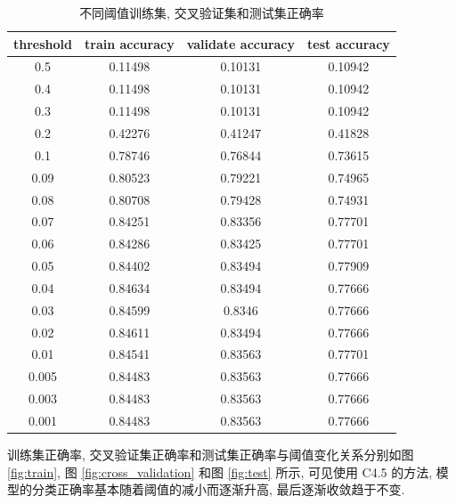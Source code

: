\documentclass[openany]{ctexbook}
\theoremstyle{kaiti}
\theoremstyle{normal}
\begin{document}
\begin{table}[htbp]
  \centering
  \caption{不同阈值训练集, 交叉验证集和测试集正确率}
  \label{tab:train_validate_acc}
  \begin{tabular}{cccc}
    \toprule
    threshold & train accuracy & validate accuracy & test accuracy \\
    \midrule
    0.5       & 0.11498        & 0.10131           & 0.10942      \\
    0.4       & 0.11498        & 0.10131           & 0.10942      \\
    0.3       & 0.11498        & 0.10131           & 0.10942      \\
    0.2       & 0.42276        & 0.41247           & 0.41828      \\
    0.1       & 0.78746        & 0.76844           & 0.73615      \\
    0.09      & 0.80523        & 0.79221           & 0.74965      \\
    0.08      & 0.80708        & 0.79428           & 0.74931      \\
    0.07      & 0.84251        & 0.83356           & 0.77701      \\
    0.06      & 0.84286        & 0.83425           & 0.77701      \\
    0.05      & 0.84402        & 0.83494           & 0.77909      \\
    0.04      & 0.84634        & 0.83494           & 0.77666      \\
    0.03      & 0.84599        & 0.8346            & 0.77666      \\
    0.02      & 0.84611        & 0.83494           & 0.77666      \\
    0.01      & 0.84541        & 0.83563           & 0.77701      \\
    0.005     & 0.84483        & 0.83563           & 0.77666      \\
    0.003     & 0.84483        & 0.83563           & 0.77666      \\
    0.001     & 0.84483        & 0.83563           & 0.77666 \\
    \bottomrule       
  \end{tabular}
\end{table}

训练集正确率, 交叉验证集正确率和测试集正确率与阈值变化关系分别如图 \ref{fig:train}, 图 \ref{fig:cross_validation} 和图 \ref{fig:test} 所示, 可见使用 C4.5 的方法, 模型的分类正确率基本随着阈值的减小而逐渐升高, 最后逐渐收敛趋于不变.
\end{document}
